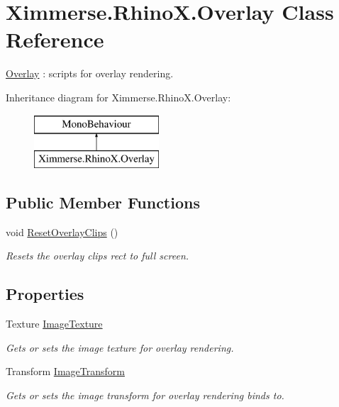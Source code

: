 \hypertarget{class_ximmerse_1_1_rhino_x_1_1_overlay}{}\section{Ximmerse.\+Rhino\+X.\+Overlay Class Reference}
\label{class_ximmerse_1_1_rhino_x_1_1_overlay}


\mbox{\hyperlink{class_ximmerse_1_1_rhino_x_1_1_overlay}{Overlay}} \+: scripts for overlay rendering.  


Inheritance diagram for Ximmerse.\+Rhino\+X.\+Overlay\+:\begin{figure}[H]
\begin{center}
\leavevmode
\includegraphics[height=2.000000cm]{class_ximmerse_1_1_rhino_x_1_1_overlay}
\end{center}
\end{figure}
\subsection*{Public Member Functions}
\begin{DoxyCompactItemize}
\item 
void \mbox{\hyperlink{class_ximmerse_1_1_rhino_x_1_1_overlay_a4fffeab006cc47fe53a3dbe2a4df7331}{Reset\+Overlay\+Clips}} ()
\begin{DoxyCompactList}\small\item\em Resets the overlay clips rect to full screen. \end{DoxyCompactList}\end{DoxyCompactItemize}
\subsection*{Properties}
\begin{DoxyCompactItemize}
\item 
Texture \mbox{\hyperlink{class_ximmerse_1_1_rhino_x_1_1_overlay_a33625bf90415d02965199b48bbaec4cc}{Image\+Texture}}
\begin{DoxyCompactList}\small\item\em Gets or sets the image texture for overlay rendering. \end{DoxyCompactList}\item 
Transform \mbox{\hyperlink{class_ximmerse_1_1_rhino_x_1_1_overlay_a146fe73ef50033f83d4eac7354dded8e}{Image\+Transform}}
\begin{DoxyCompactList}\small\item\em Gets or sets the image transform for overlay rendering binds to. \end{DoxyCompactList}\end{DoxyCompactItemize}


